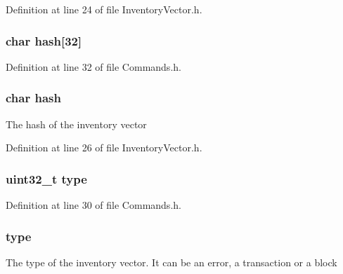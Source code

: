 Definition at line 24 of file InventoryVector.h.

\hypertarget{struct_inventory_vector_a30660ee1bca7189182e64c5a192651af}{
\subsubsection[{hash}]{\setlength{\rightskip}{0pt plus 5cm}char {\bf hash}\mbox{[}32\mbox{]}}}
\label{struct_inventory_vector_a30660ee1bca7189182e64c5a192651af}


Definition at line 32 of file Commands.h.

\hypertarget{struct_inventory_vector_a5309b3103b4345688327148e3c589014}{
\subsubsection[{hash}]{\setlength{\rightskip}{0pt plus 5cm}char {\bf hash}}}
\label{struct_inventory_vector_a5309b3103b4345688327148e3c589014}
The hash of the inventory vector 

Definition at line 26 of file InventoryVector.h.

\hypertarget{struct_inventory_vector_ad44b615021ed3ccb734fcaf583ef4a03}{
\subsubsection[{type}]{\setlength{\rightskip}{0pt plus 5cm}uint32\_\-t {\bf type}}}
\label{struct_inventory_vector_ad44b615021ed3ccb734fcaf583ef4a03}


Definition at line 30 of file Commands.h.

\hypertarget{struct_inventory_vector_aae693fef743079289c6c94035f7aae77}{
\subsubsection[{type}]{ {\bf type}}}
\label{struct_inventory_vector_aae693fef743079289c6c94035f7aae77}
The type of the inventory vector. It can be an error, a transaction or a block 

